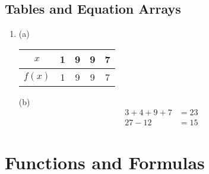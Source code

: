 \documentclass{article}
\begin{document}
\subsection{Tables and Equation Arrays}

\begin{enumerate}
\item (a)
    \begin{tabular}{c|c|c|c|c}
        $x$ & 1 & 9 & 9 & 7 \\ \hline
        $f(x)$ & 1 & 9 & 9 & 7 \\
    \end{tabular}

    (b)
    \begin{align*}
        3 + 4 + 9 + 7 &= 23 \\
        27 - 12 &= 15
    \end{align*}
\end{enumerate}

\section{Functions and Formulas}
\end{document}
